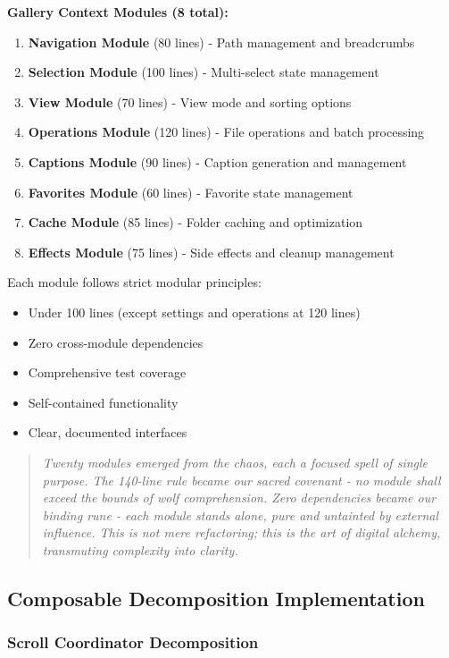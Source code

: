 \documentclass[11pt]{article}
\begin{document}
\textbf{Gallery Context Modules (8 total):}
\begin{enumerate}
\item \textbf{Navigation Module} (80 lines) - Path management and breadcrumbs
\item \textbf{Selection Module} (100 lines) - Multi-select state management
\item \textbf{View Module} (70 lines) - View mode and sorting options
\item \textbf{Operations Module} (120 lines) - File operations and batch processing
\item \textbf{Captions Module} (90 lines) - Caption generation and management
\item \textbf{Favorites Module} (60 lines) - Favorite state management
\item \textbf{Cache Module} (85 lines) - Folder caching and optimization
\item \textbf{Effects Module} (75 lines) - Side effects and cleanup management
\end{enumerate}

Each module follows strict modular principles:
\begin{itemize}
\item Under 100 lines (except settings and operations at 120 lines)
\item Zero cross-module dependencies
\item Comprehensive test coverage
\item Self-contained functionality
\item Clear, documented interfaces
\end{itemize}

\begin{quote}
\emph{Twenty modules emerged from the chaos, each a focused spell of single purpose. The 140-line rule became our sacred covenant - no module shall exceed the bounds of wolf comprehension. Zero dependencies became our binding rune - each module stands alone, pure and untainted by external influence. This is not mere refactoring; this is the art of digital alchemy, transmuting complexity into clarity.}
\end{quote}

\subsection{Composable Decomposition Implementation}

\subsubsection{Scroll Coordinator Decomposition}
\end{document}
